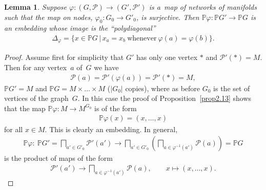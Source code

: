 \documentclass[pdftex]{sigma}
\numberwithin{equation}{section}
\newtheorem{Lemma}[Theorem]{Lemma}
\begin{document}
\begin{Lemma}
\label{lemma:2.surj}
Suppose $\varphi\colon (G,{\mathcal P})\to (G',{\mathcal P}')$ is a~map of networks of manifolds such that the map on
nodes, $\varphi_0\colon G_0 \to G'_0$, is surjective.
Then $\mathbb{P}\varphi\colon \mathbb{P} G'\to \mathbb{P} G$ is an embedding whose image is the ``polydiagonal''
\begin{gather*}
\Delta_\varphi = \{x\in \mathbb{P} G\,|\, x_a = x_b\ \text{whenever}\ \varphi(a) = \varphi(b)\}.
\end{gather*}
\end{Lemma}
\begin{proof}
Assume f\/irst for simplicity that $G'$ has only one vertex $*$ and ${\mathcal P}'(*) = M$.
Then for any vertex~$a$ of~$G$ we have
\begin{gather*}
{\mathcal P}(a) = {\mathcal P}' (\varphi(a)) = {\mathcal P}'(*) = M,
\end{gather*}
$\mathbb{P} G' = M$ and $\mathbb{P} G = M\times \dots \times M$ ($|G_0|$ copies), where as before $G_0$ is the set of vertices of the graph~$G$.
In this case the proof of Proposition~\ref{prop2.13} shows that the map $\mathbb{P}\varphi\colon M\to M^{G_0}$ is of the form
\begin{gather*}
\mathbb{P} \varphi (x) = (x,\ldots, x)
\end{gather*}
for all $x\in M$.
This is clearly an embedding.
In general,
\begin{gather*}
\mathbb{P} \varphi\colon \ \mathbb{P} G' =\bigsqcap_{a'\in G'_0} {\mathcal P}' (a') \to \bigsqcap_{a'\in G'_0}
\left(\bigsqcap_{a\in \varphi^{-1} (a')} {\mathcal P}(a)\right) = \mathbb{P} G
\end{gather*}
is the product of maps of the form
\begin{gather*}
{\mathcal P}' (a') \to \bigsqcap_{a\in \varphi^{-1} (a')} {\mathcal P}(a),
\qquad
x\mapsto (x,\ldots, x).\tag*{\qed}
\end{gather*}
\renewcommand{\qed}{}
\end{proof}
\end{document}
